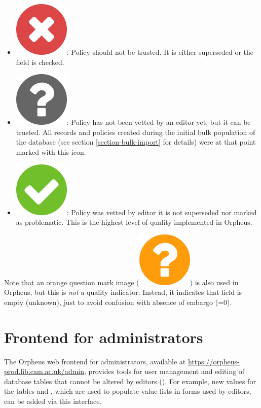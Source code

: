 \documentclass[british, 12pt]{article}
\begin{document}
\begin{itemize}
  \item \includegraphics{icon-no}: Policy should not be trusted. It is either superseded or the field  is checked.
  \item \includegraphics{icon-unknown}: Policy has not been vetted by an editor yet, but it can be trusted. All records and policies created during the initial bulk population of the database (see section \vref{section-bulk-import} for details) were at that point marked with this icon.
  \item \includegraphics{icon-yes}: Policy was vetted by editor it is not superseded nor marked as problematic. This is the highest level of quality implemented in Orpheus.
\end{itemize}

\begin{warn}
  Note that an orange question mark image (\includegraphics{icon-unknown-orange}) is also used in Orpheus, but this is \emph{not} a quality indicator. Instead, it indicates that field  is empty (unknown), just to avoid confusion with absence of embargo (=0). 
\end{warn}

\section{Frontend for administrators}
The Orpheus web frontend for administrators, available at \url{https://orpheus-prod.lib.cam.ac.uk/admin}, provides tools for user management and editing of database tables that cannot be altered by editors (). For example, new values for the tables  and , which are used to populate value lists in forms used by editors, can be added via this interface.
\end{document}
